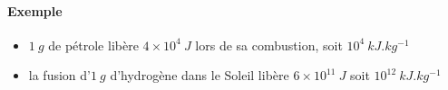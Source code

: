 \paragraph{Exemple}
\begin{itemize}
 \item $1~g$ de pétrole libère $4\times 10^4~J$ lors de sa combustion, soit $10^4~kJ.kg^{-1}$
 \item la fusion d'$1~g$ d'hydrogène dans le Soleil libère $6 \times 10^{11}~J$ soit $ 10^{12}~kJ.kg^{-1}$ 
\end{itemize}
